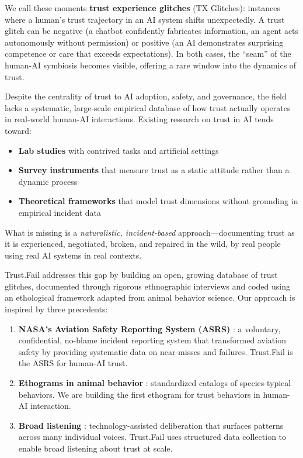 \documentclass[11pt,a4paper]{article}
\begin{document}
We call these moments \textbf{trust experience glitches} (TX Glitches): instances where a human's trust trajectory in an AI system shifts unexpectedly. A trust glitch can be negative (a chatbot confidently fabricates information, an agent acts autonomously without permission) or positive (an AI demonstrates surprising competence or care that exceeds expectations). In both cases, the ``seam'' of the human-AI symbiosis becomes visible, offering a rare window into the dynamics of trust.

Despite the centrality of trust to AI adoption, safety, and governance, the field lacks a systematic, large-scale empirical database of how trust actually operates in real-world human-AI interactions. Existing research on trust in AI tends toward:

\begin{itemize}[noitemsep]
    \item \textbf{Lab studies} with contrived tasks and artificial settings \citep{hancock2011meta, hoff2015trust}
    \item \textbf{Survey instruments} that measure trust as a static attitude rather than a dynamic process \citep{jian2000foundations, lee2004trust}
    \item \textbf{Theoretical frameworks} that model trust dimensions without grounding in empirical incident data \citep{mayer1995integrative, castelfranchi2010trust}
\end{itemize}

What is missing is a \textit{naturalistic, incident-based} approach---documenting trust as it is experienced, negotiated, broken, and repaired in the wild, by real people using real AI systems in real contexts.

Trust.Fail addresses this gap by building an open, growing database of trust glitches, documented through rigorous ethnographic interviews and coded using an ethological framework adapted from animal behavior science. Our approach is inspired by three precedents:

\begin{enumerate}[noitemsep]
    \item \textbf{NASA's Aviation Safety Reporting System (ASRS)} \citep{reynard1986asrs}: a voluntary, confidential, no-blame incident reporting system that transformed aviation safety by providing systematic data on near-misses and failures. Trust.Fail is the ASRS for human-AI trust.
    \item \textbf{Ethograms in animal behavior} \citep{martin2007measuring}: standardized catalogs of species-typical behaviors. We are building the first ethogram for trust behaviors in human-AI interaction.
    \item \textbf{Broad listening} \citep{small2023polis}: technology-assisted deliberation that surfaces patterns across many individual voices. Trust.Fail uses structured data collection to enable broad listening about trust at scale.
\end{enumerate}
\end{document}
